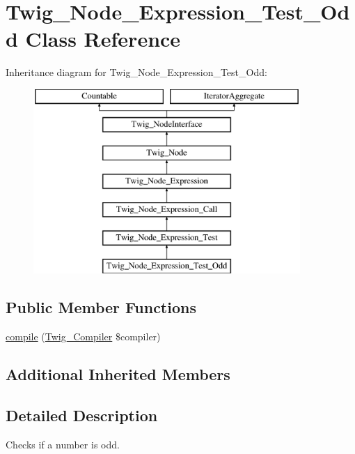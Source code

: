 \hypertarget{class_twig___node___expression___test___odd}{}\section{Twig\+\_\+\+Node\+\_\+\+Expression\+\_\+\+Test\+\_\+\+Odd Class Reference}
\label{class_twig___node___expression___test___odd}
Inheritance diagram for Twig\+\_\+\+Node\+\_\+\+Expression\+\_\+\+Test\+\_\+\+Odd\+:\begin{figure}[H]
\begin{center}
\leavevmode
\includegraphics[height=7.000000cm]{class_twig___node___expression___test___odd}
\end{center}
\end{figure}
\subsection*{Public Member Functions}
\begin{DoxyCompactItemize}
\item 
\hyperlink{class_twig___node___expression___test___odd_a4e0faa87c3fae583620b84d3607085da}{compile} (\hyperlink{class_twig___compiler}{Twig\+\_\+\+Compiler} \$compiler)
\end{DoxyCompactItemize}
\subsection*{Additional Inherited Members}


\subsection{Detailed Description}
Checks if a number is odd.


